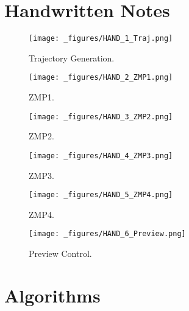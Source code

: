 \documentclass{UoNMCHA}
\begin{document}
	\appendix
		\newpage\section{Handwritten Notes}\label{app:Hand}
		\begin{figure}[!h]
		    \begin{center}
		        \texttt{[image: \_figures/HAND\_1\_Traj.png]}
		        \caption{Trajectory Generation.}
		        \label{fig:APP_TrajGen}
		    \end{center}
		\end{figure}
		\begin{figure}[!h]
		    \begin{center}
		        \texttt{[image: \_figures/HAND\_2\_ZMP1.png]}
		        \caption{ZMP1.}
		        \label{fig:APP_ZMP1}
		    \end{center}
		\end{figure}
		\begin{figure}[!h]
		    \begin{center}
		        \texttt{[image: \_figures/HAND\_3\_ZMP2.png]}
		        \caption{ZMP2.}
		        \label{fig:APP_ZMP2}
		    \end{center}
		\end{figure}
		\begin{figure}[!h]
		    \begin{center}
		        \texttt{[image: \_figures/HAND\_4\_ZMP3.png]}
		        \caption{ZMP3.}
		        \label{fig:APP_ZMP3}
		    \end{center}
		\end{figure}
		\begin{figure}[!h]
		    \begin{center}
		        \texttt{[image: \_figures/HAND\_5\_ZMP4.png]}
		        \caption{ZMP4.}
		        \label{fig:APP_ZMP4}
		    \end{center}
		\end{figure}
		\begin{figure}[!h]
		    \begin{center}
		        \texttt{[image: \_figures/HAND\_6\_Preview.png]}
		        \caption{Preview Control.}
		        \label{fig:APP_PREVIEW}
		    \end{center}
		\end{figure}
		\clearpage
		\newpage\section{Algorithms}\label{app:Algo}
		
\end{document}
